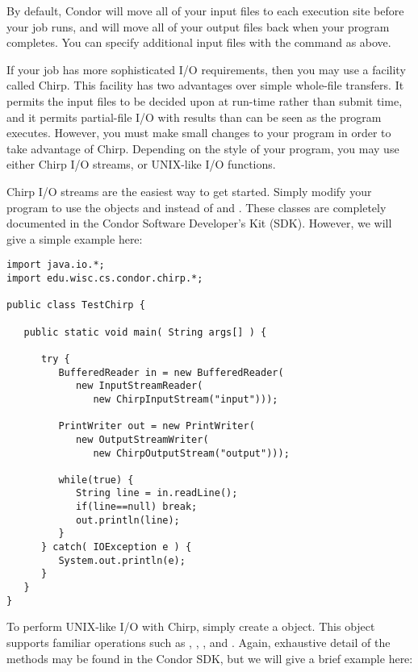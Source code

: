 By default, Condor will move all of your input files
to each execution site before your job runs, and will move
all of your output files back when your program completes.
You can specify additional input files with the 
 command as above.

If your job has more sophisticated I/O requirements, then
you may use a facility called Chirp.  This facility
has two advantages over simple whole-file transfers.
It permits the input files to be decided upon at run-time
rather than submit time, and it permits partial-file I/O
with results than can be seen as the program executes.
However, you must make small changes to your program
in order to take advantage of Chirp.  Depending on the
style of your program, you may use either Chirp I/O streams,
or UNIX-like I/O functions.

Chirp I/O streams are the easiest way to get started.
Simply modify your program to use the objects 
and  instead of  and
.  These classes are completely documented
in the Condor Software Developer's Kit (SDK).  However, we will
give a simple example here:

\begin{verbatim}
import java.io.*;
import edu.wisc.cs.condor.chirp.*;

public class TestChirp {

   public static void main( String args[] ) {

      try {
         BufferedReader in = new BufferedReader(
            new InputStreamReader(
               new ChirpInputStream("input")));

         PrintWriter out = new PrintWriter(
            new OutputStreamWriter(
               new ChirpOutputStream("output")));

         while(true) {
            String line = in.readLine();
            if(line==null) break;
            out.println(line);
         }
      } catch( IOException e ) {
         System.out.println(e);
      }
   }
}
\end{verbatim}

To perform UNIX-like I/O with Chirp, simply create
a  object.  This object supports
familiar operations such as , ,
, and .  Again, exhaustive
detail of the methods may be found in the Condor 
SDK, but we will give a brief example here:

